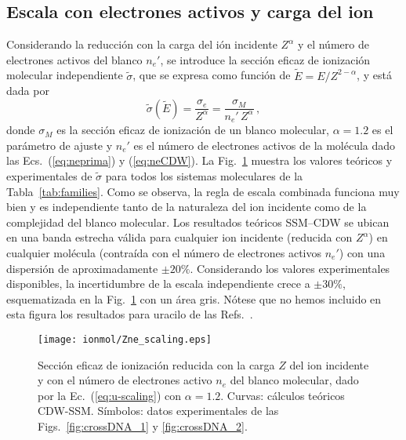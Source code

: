 \subsection{Escala con electrones activos y carga del ion}
\label{sec:nez_scaling}

Considerando la reducción con la carga del ión incidente $Z^\alpha$ y  
el número de electrones activos del blanco $n_e'$, se introduce la 
sección eficaz de ionización molecular independiente $\tilde{\sigma}$, 
que se expresa como función de $\tilde{E}=E/Z^{2-\alpha}$, y está dada 
por 
\begin{equation}
\tilde{\sigma}\left(\tilde{E}\right)=\frac{\sigma_e}{Z^{\alpha}}
=\frac{\sigma_M}{n_e'\,Z^{\alpha}}\,,
\label{eq:u-scaling}
\end{equation}
donde $\sigma_M$ es la sección eficaz de ionización de un blanco 
molecular, $\alpha=1.2$ es el parámetro de ajuste y $n_e'$ es el número 
de electrones activos de la molécula dado las Ecs.~(\ref{eq:neprima}) y 
(\ref{eq:neCDW}). La Fig.~\ref{fig:zalpha} muestra los valores teóricos 
y experimentales de $\tilde{\sigma}$ para todos los sistemas moleculares 
de la Tabla~\ref{tab:families}. Como se observa, la regla de escala 
combinada funciona muy bien y es independiente tanto de la naturaleza 
del ion incidente como de la complejidad del blanco molecular. Los 
resultados teóricos SSM--CDW se ubican en una banda estrecha válida para 
cualquier ion incidente (reducida con $Z^\alpha$) en cualquier molécula 
(contraída con el número de electrones activos $n_e'$) con una 
dispersión de aproximadamente $\pm 20\%$. Considerando los valores 
experimentales disponibles, la incertidumbre de la escala independiente 
crece a $\pm 30\%$, esquematizada en la Fig.~\ref{fig:zalpha} con un 
área gris. Nótese que no hemos incluido en esta figura los resultados 
para uracilo de las Refs.~\cite{agnihotri2012,agnihotri2013}. 

\begin{figure}[t]
\centering
\texttt{[image: ionmol/Zne\_scaling.eps]}
\caption[Sección eficaz de ionización reducida por $Z$ y $n_e$.]
{Sección eficaz de ionización reducida con la carga $Z$ del ion 
incidente y con el número de electrones activo $n_e$ del blanco 
molecular, dado por la Ec.~(\ref{eq:u-scaling}) con $\alpha=1.2$. 
Curvas: cálculos teóricos CDW-SSM. Símbolos: datos experimentales de 
las Figs.~\ref{fig:crossDNA_1} y \ref{fig:crossDNA_2}.}
\label{fig:zalpha}
\end{figure} 

